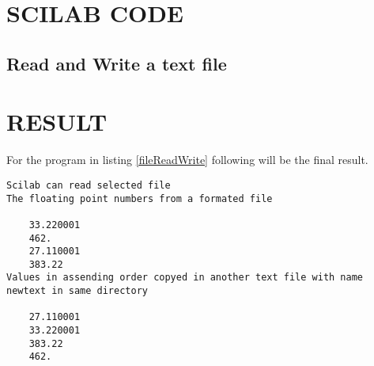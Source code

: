 \section*{SCILAB CODE}
\subsection*{Read and Write a text file}







\section*{RESULT}

For the program in listing \ref{fileReadWrite} following will be the final result.

\begin{lstlisting}[numbers=none]
 Scilab can read selected file
The floating point numbers from a formated file
 
    33.220001  
    462.       
    27.110001  
    383.22     
Values in assending order copyed in another text file with name newtext in same directory
 
    27.110001  
    33.220001  
    383.22     
    462.       
 \end{lstlisting}
 
 
